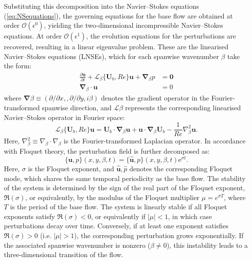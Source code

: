 Substituting this decomposition into the Navier–Stokes equations (\ref{eq:NSequations}), the governing equations for the base flow are obtained at order $\mathcal{O}(\epsilon^0)$, yielding the two-dimensional incompressible Navier–Stokes equations. At order $\mathcal{O}(\epsilon^1)$, the evolution equations for the perturbations are recovered, resulting in a linear eigenvalue problem. These are the linearised Navier–Stokes equations (LNSEs), which for each spanwise wavenumber $\beta$ take the form:
%
\begin{equation}
\begin{aligned}
\frac{\partial \bm{u}}{\partial t} + \mathcal{L}_\beta\{\bm{U}_b,Re\}\bm{u} + \bm{\nabla}_\beta p & = \bm{0} \\
\bm{\nabla}_\beta \cdot \bm{u} & = 0
\end{aligned}
\label{eq:LNSEs}
\end{equation}
%
where $\boldsymbol{\nabla}\beta \equiv \left( \partial / \partial x, , \partial / \partial y, i\beta \right)$ denotes the gradient operator in the Fourier-transformed spanwise direction, and $\mathcal{L}\beta$ represents the corresponding linearised Navier–Stokes operator in Fourier space:
%
\begin{equation}
\mathcal{L}_\beta\{\bm{U}_b,Re\}\bm{u}=\bm{U}_b \cdot \bm{\nabla}_\beta \bm{u} + \bm{u} \cdot \bm{\nabla}_\beta \bm{U}_b - \frac{1}{Re} \nabla^2_\beta \bm{u}.
\end{equation}
%
Here, $\nabla^2_\beta \equiv \nabla_\beta \cdot \nabla_\beta$ is the Fourier-transformed Laplacian operator. In accordance with Floquet theory, the perturbation field is further decomposed as:
%
\begin{equation}
\{\bm{u},p\}(x,y,\beta,t) = \{\hat{\bm{u}},\hat{p}\}(x,y,\beta,t) \text{e}^{\sigma t}.
\label{eq:ansatz}
\end{equation}
%
Here, $\sigma$ is the Floquet exponent, and ${\hat{\boldsymbol{u}}, \hat{p}}$ denotes the corresponding Floquet mode, which shares the same temporal periodicity as the base flow. The stability of the system is determined by the sign of the real part of the Floquet exponent, $\Re(\sigma)$, or equivalently, by the modulus of the Floquet multiplier $\mu = e^{\sigma T}$, where $T$ is the period of the base flow. The system is linearly stable if all Floquet exponents satisfy $\Re(\sigma) < 0$, or equivalently if $|\mu| < 1$, in which case perturbations decay over time. Conversely, if at least one exponent satisfies $\Re(\sigma) > 0$ (i.e. $|\mu| > 1$), the corresponding perturbation grows exponentially. If the associated spanwise wavenumber is nonzero ($\beta \neq 0$), this instability leads to a three-dimensional transition of the flow.

